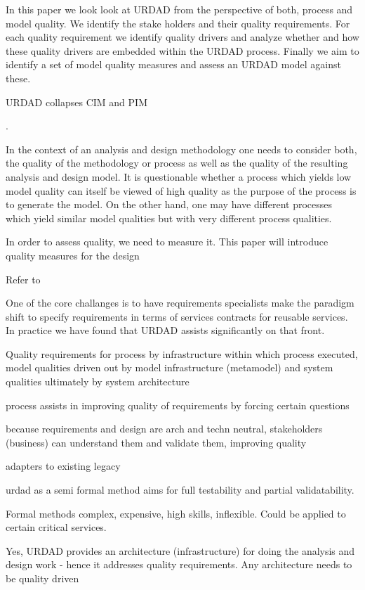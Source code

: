 In this paper we look look at URDAD from the perspective of both, process and model quality. We identify the stake holders and their quality requirements. For each quality requirement we identify quality drivers and analyze whether and how these quality drivers are embedded within the URDAD process. Finally we aim to identify a set of model quality measures and assess an URDAD model against these.



URDAD collapses CIM and PIM

\cite{lange_managing_2005,lange_improving_2006}.


In the context of an analysis and design methodology one needs to consider both, the quality of the methodology or process as well as the quality of the resulting analysis and design model. It is questionable whether a process which yields low model quality can itself be viewed of high quality as the purpose of the process is to generate the model. On the other hand, one may have different processes which yield similar model qualities but with very different process qualities. 

In order to assess quality, we need to measure it. This paper will introduce quality measures for the design

Refer to \cite{wirfs-brock_object-oriented_1989}

One of the core challanges is to have requirements specialists make the paradigm shift to specify requirements in terms of services contracts for reusable services\cite{haines_impact_2007}. In practice we have found that URDAD assists significantly on that front.



Quality requirements for process  by infrastructure within which process executed, model qualities driven out by model infrastructure (metamodel) and system qualities ultimately by system architecture

process assists in improving quality of requirements by forcing certain questions

because requirements and design are arch and techn neutral, stakeholders (business) can understand them and validate them, improving quality

adapters to existing legacy

urdad as a semi formal method aims for full testability and partial validatability.

Formal methods complex, expensive, high skills, inflexible. Could be applied to certain critical services.

 
Yes, URDAD provides an architecture (infrastructure) for doing the analysis and design work - hence it addresses quality requirements. Any architecture needs to be quality driven
